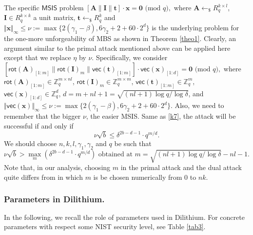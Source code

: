 \documentclass[conference]{IEEEtran}
\begin{document}
\begin{itemize}
		\end{itemize}
		
		
		The  specific $\mathsf{MSIS}$ problem $[\mathbf{A}\|\mathbf{I}\|\mathbf{t}]\cdot \mathbf{x}=\mathbf{0}\text{ (mod } q),$ where $\mathbf{A} \leftarrow_{\$} R_q^{k \times l}$, $\mathbf{I} \in R_q^{k \times k}$ a unit matrix, $\mathbf{t} \leftarrow_{\$} R_q^{k}$ and $\Vert \mathbf{x} \Vert_{\infty} \leq \nu:= \max\{2(\gamma_1-\beta), 6\gamma_2+2+60 \cdot 2^d\}$ is the underlying problem for the one-more unforgeability of \textsf{MBS} as shown in Theorem \ref{theo1}. Clearly, an argument similar to the primal attack mentioned above can be applied here except that we replace $\eta$ by $\nu$. 
		\iffalse
		Specifically, we consider $[\textsf{rot}(\mathbf{A})_{[1:m]}\|\textsf{rot}(\mathbf{I})_{m}\|\textsf{vec}(\mathbf{t})_{[1:m]}]\cdot \textsf{vec}(\mathbf{x})_{[1:d]}=\mathbf{0}\text{ (mod } q),$ where $\textsf{rot}(\mathbf{A})_{[1:m]} \in \mathbb{Z}_q^{m\times nl}$, $\textsf{rot}(\mathbf{I})_{m} \in \mathbb{Z}_q^{m\times m}$, $\textsf{vec}(\mathbf{t})_{[1:m]}\in \mathbb{Z}_q^{m}$, $\textsf{vec}(\mathbf{x})_{[1:d]}\in \mathbb{Z}_q^{d}$, $d=m+nl+1=\sqrt{(nl+1)\log q/\log \delta}$, and $\Vert\textsf{vec}(\mathbf{x})\Vert_{\infty} \leq \nu:= \max\{2(\gamma_1-\beta), 6\gamma_2+2+60 \cdot 2^d\}$. Also, we need to remember that the bigger $\nu$, the easier \textsf{MSIS}. Same as \eqref{k7}, the attack will be successful if and only if 
		\begin{equation}\label{k9}
		\nu \sqrt{b}\leq \delta^{2b-d-1}\cdot q^{m/d}.
		\end{equation}
		We should choose $n,k,l, \gamma_1, \gamma_2$ and $q$ be such that
		$$\nu\sqrt{b} >  \max_m ( \delta^{2b-d-1}\cdot q^{m/d}) \text{ obtained at } m=\sqrt{(nl+1)\log q/\log \delta}-nl-1.$$
		Note that, in our analysis, choosing $m$ in the primal attack and the dual attack quite differs from \cite[Appendix D.3]{DKL+19} in which $m$ is be chosen numerically from $0$ to $nk$. 
		
		
		\subsubsection{Parameters in \textsf{Dilithium}.} In the following, we recall the role of parameters used in \textsf{Dilithium}. For concrete parameters with respect some NIST security level, see Table \ref{tab3}. 
		
\end{document}
